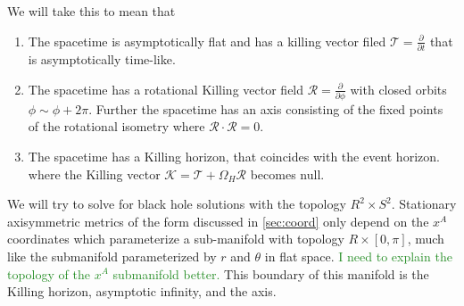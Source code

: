 \documentclass[aps,prd,amsmath,showpacs,amssymb,superscriptaddress,nofootinbib,longbibliography,eqsecnum,preprintnumbers]{revtex4-1}
\newcommand{\zach}[1]{\textcolor{ForestGreen}{#1}}
\begin{document}
We will take this to mean that 
\begin{enumerate}
\item The spacetime is asymptotically flat and has a killing vector filed $\mathcal{T}=\frac{\partial}{\partial t}$ that is asymptotically time-like. 
\item The spacetime has a rotational Killing vector field $\mathcal{R=\frac{\partial}{\partial \phi}}$ with closed orbits $\phi \sim \phi +2\pi$. Further the spacetime has an axis consisting of the fixed points of the rotational isometry where $\mathcal{R}\cdot\mathcal{R}=0$.
\item The spacetime has a Killing horizon, that coincides with the event horizon. where the Killing vector $\mathcal{K}=\mathcal{T}+\Omega_H \mathcal{R}$ becomes null.
\end{enumerate}
%
We will try to solve for black hole solutions with the topology $R^2\times S^2$. Stationary axisymmetric metrics of the form discussed in \ref{sec:coord} only depend on the $x^A$ coordinates which parameterize a sub-manifold with topology $R \times [0,\pi]$, much like the submanifold parameterized by $r$ and $\theta$ in flat space. \zach{I need to explain the topology of the $x^A$ submanifold better.} This boundary of this manifold is the Killing horizon, asymptotic infinity, and the axis. 
%
%
%
%
\end{document}
